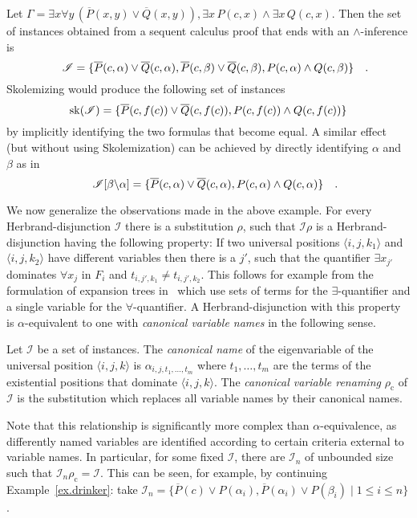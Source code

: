 \documentclass{LMCS}
\theoremstyle{plain}
\theoremstyle{definition}
\def\cI{{\mathcal I}}
\def\set#1{\{#1\}}
\def\wcneg#1{\overline{#1}}
\def\quadfs {\rlap{\rm\quad.}}\def\quadcm {\rlap{\rm\quad,}}\def\quadsc {\rlap{\rm\quad;}}\def\quadcl {\rlap{\rm\quad:}}\def\quadqm {\rlap{\rm\quad?}}
\newcommand{\sop}{[}
\newcommand{\scl}{]}
\newcommand{\sel}[2]{#1 \backslash #2}
\newcommand{\unsubst}[2]{\sop \sel{#1}{#2} \scl}
\newcommand{\dual}[1]{\wcneg{#1}}
\begin{document}
\begin{exa}
Let $\Gamma = \exists x\forall y\, ( \dual{P}(x,y) \lor \dual{Q}(x,y) ),
\exists x\, P(c,x) \land \exists x\, Q(c,x)$. Then the set of instances
obtained from a sequent calculus proof that ends with an $\land$-inference is
\[
\cI = \set{\dual{P}(c,\alpha)\lor\dual{Q}(c,\alpha), \dual{P}(c,\beta)\lor\dual{Q}(c,\beta),
P(c,\alpha)\land Q(c,\beta)}\quadfs
\]
Skolemizing would produce the following set of instances
\[
\sk(\cI) = \set{\dual{P}(c,f(c))\lor\dual{Q}(c,f(c)), P(c,f(c))\land Q(c,f(c))}
\]
by implicitly identifying the two formulas that become equal. A similar effect
(but without using Skolemization) can be achieved by directly
identifying $\alpha$ and $\beta$ as in
\[
\cI\unsubst{\beta}{\alpha} = \set{\dual{P}(c,\alpha)\lor\dual{Q}(c,\alpha), P(c,\alpha)\land Q(c,\alpha)}\quadfs
\]
\end{exa}

We now generalize the observations made in the above example.  For
every Herbrand-disjunction $\cI$ there is a substitution $\rho$, such
that $\cI\rho$ is a Herbrand-disjunction having the following
property: If two universal positions $\langle i,j, k_1\rangle$ and
$\langle i,j,k_2\rangle$ have different variables then there is a
$j'$, such that the quantifier $\exists x_{j'}$ dominates $\forall
x_j$ in $F_i$ and $t_{i,j',k_1} \neq t_{i,j',k_2}$. This follows for
example from the formulation of expansion trees
in~\cite{Chaudhuri12Systematic,ChaudhuriXXIsomorphism} which use sets
of terms for the $\exists$-quantifier and a single variable for the
$\forall$-quantifier.  A Herbrand-disjunction with this property is
$\alpha$-equivalent to one with {\em canonical variable names} in the
following sense.
\begin{defi}
Let $\cI$ be a set of instances. The {\em canonical name} of the eigenvariable
of the universal position $\langle i,j,k \rangle$
is $\alpha_{i,j,t_1,\ldots,t_m}$ where $t_1,\ldots,t_m$ are the terms of the existential
positions that dominate $\langle i,j,k\rangle$. The {\em canonical variable
renaming} $\rho_\mathrm{c}$ of $\cI$ is the substitution which replaces all variable
names by their canonical names.
\end{defi}

\begin{rem}
  Note that this relationship is significantly more complex than
  $\alpha$-equivalence, as differently named variables are identified
  according to certain criteria external to variable names. In
  particular, for some fixed $\cI$, there are $\cI_n$ of unbounded
  size such that $\cI_n\rho_\mathrm{c} = \cI$.  This can be seen, for
  example, by continuing Example~\ref{ex.drinker}: take $\cI_n = \{
  \dual{P}(c)\lor P(\alpha_i), \dual{P}(\alpha_i) \lor P(\beta_i) \mid
  1\leq i\leq n \}$.
\end{rem}
\end{document}
